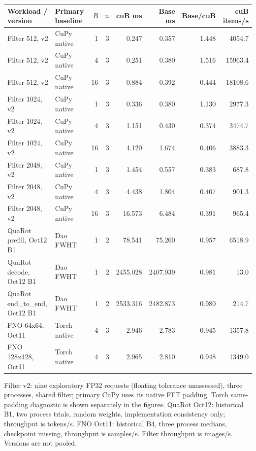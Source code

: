 \begingroup
\scriptsize
\setlength{\tabcolsep}{3pt}
\begin{tabular}{llrrrrrr}
\hline
Workload / version & Primary baseline & $B$ & $n$ & cuB ms & Base ms & Base/cuB & cuB items/s \\
\hline
Filter 512, v2 & CuPy native & 1 & 3 & 0.247 & 0.357 & 1.448 & 4054.7 \\
Filter 512, v2 & CuPy native & 4 & 3 & 0.251 & 0.380 & 1.516 & 15963.4 \\
Filter 512, v2 & CuPy native & 16 & 3 & 0.884 & 0.392 & 0.444 & 18108.6 \\
Filter 1024, v2 & CuPy native & 1 & 3 & 0.336 & 0.380 & 1.130 & 2977.3 \\
Filter 1024, v2 & CuPy native & 4 & 3 & 1.151 & 0.430 & 0.374 & 3474.7 \\
Filter 1024, v2 & CuPy native & 16 & 3 & 4.120 & 1.674 & 0.406 & 3883.3 \\
Filter 2048, v2 & CuPy native & 1 & 3 & 1.454 & 0.557 & 0.383 & 687.8 \\
Filter 2048, v2 & CuPy native & 4 & 3 & 4.438 & 1.804 & 0.407 & 901.3 \\
Filter 2048, v2 & CuPy native & 16 & 3 & 16.573 & 6.484 & 0.391 & 965.4 \\
QuaRot prefill, Oct12 B1 & Dao FWHT & 1 & 2 & 78.541 & 75.200 & 0.957 & 6518.9 \\
QuaRot decode, Oct12 B1 & Dao FWHT & 1 & 2 & 2455.028 & 2407.939 & 0.981 & 13.0 \\
QuaRot end_to_end, Oct12 B1 & Dao FWHT & 1 & 2 & 2533.316 & 2482.873 & 0.980 & 214.7 \\
FNO 64x64, Oct11 & Torch native & 4 & 3 & 2.946 & 2.783 & 0.945 & 1357.8 \\
FNO 128x128, Oct11 & Torch native & 4 & 3 & 2.965 & 2.810 & 0.948 & 1349.0 \\
\hline
\end{tabular}
\par\smallskip
\parbox{\linewidth}{Filter v2: nine exploratory FP32 requests (floating tolerance unassessed), three processes, shared filter; primary CuPy uses its native FFT padding. Torch same-padding diagnostic is shown separately in the figures. QuaRot Oct12: historical B1, two process trials, random weights, implementation consistency only; throughput is tokens/s. FNO Oct11: historical B4, three process medians, checkpoint missing, throughput is samples/s. Filter throughput is images/s. Versions are not pooled.}
\endgroup

